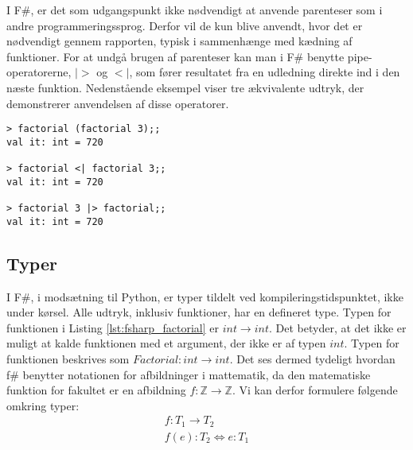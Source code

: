 I F\#, er det som udgangspunkt ikke nødvendigt at anvende parenteser som i andre programmeringssprog. Derfor vil de kun blive anvendt, hvor det er nødvendigt gennem rapporten, typisk i sammenhænge med kædning af funktioner. For at undgå brugen af parenteser kan man i F\# benytte pipe-operatorerne, $|>$ og $<|$, som fører resultatet fra en udledning direkte ind i den næste funktion. Nedenstående eksempel viser tre ækvivalente udtryk, der demonstrerer anvendelsen af disse operatorer.

\begin{lstlisting}[style=output, label={lst:pipe_operator}, caption={Eksempel på anvendelse af pipe-operatorer i F\# ved udregning af $(3!)! = 6! = 720 $.}]
> factorial (factorial 3);;
val it: int = 720

> factorial <| factorial 3;;
val it: int = 720

> factorial 3 |> factorial;;
val it: int = 720
\end{lstlisting}




\subsection{Typer}
I F\#, i modsætning til Python, er typer tildelt ved kompileringstidspunktet, ikke under kørsel. Alle udtryk, inklusiv funktioner, har en defineret type. Typen for funktionen i Listing \textcolor{red}{\ref{lst:fsharp_factorial}} er $int \rightarrow int$. Det betyder, at det ikke er muligt at kalde funktionen med et argument, der ikke er af typen $int$. Typen for funktionen beskrives som $Factorial: int \rightarrow int$. Det ses dermed tydeligt hvordan f\# benytter notationen for afbildninger i mattematik, da den matematiske funktion for fakultet er en afbildning $f: \mathbb{Z} \to \mathbb{Z}$. Vi kan derfor formulere følgende omkring typer:
\begin{gather*}
    f: T_1 \rightarrow T_2 \\
    f(e) : T_2 \iff e : T_1
\end{gather*}

